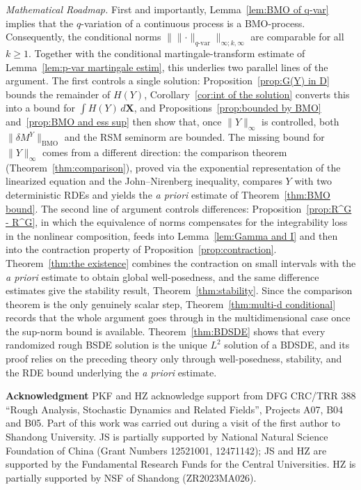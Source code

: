 \documentclass[11pt,reqno]{amsart}
\numberwithin{equation}{section}
\begin{document}
{\em Mathematical Roadmap.} First and importantly,   Lemma~\ref{lem:BMO of q-var} implies that the $q$-variation of a continuous process is a \textrm{BMO}-process. Consequently, the conditional norms $\| \|\bm\cdot\|_{q\text{-}\mathrm{var}} \|_{\infty;k,\infty}$ are comparable for all $k \ge 1$. Together with the conditional martingale-transform estimate of Lemma~\ref{lem:p-var martingale estim}, this underlies two parallel lines of the argument.
The first controls a single solution: Proposition~\ref{prop:G(Y) in D} bounds the remainder of $H(Y)$, Corollary~\ref{cor:int of the solution} converts this into a bound for $\int H(Y)\,d\mathbf X$, and Propositions~\ref{prop:bounded by BMO} and~\ref{prop:BMO and ess sup} then show that, once $\|Y\|_{\infty}$ is controlled, both $\|\delta M^{Y}\|_{\mathrm{BMO}}$ and the RSM seminorm are bounded.
The missing bound for $\|Y\|_{\infty}$ comes from a different direction: the comparison theorem (Theorem~\ref{thm:comparison}), proved via the exponential representation of the linearized equation and the John--Nirenberg inequality, compares $Y$ with two deterministic RDEs and yields the \emph{a priori} estimate of Theorem~\ref{thm:BMO bound}. 
The second line of argument controls differences: Proposition~\ref{prop:R^G - R^G}, in which the equivalence of norms compensates for the integrability loss in the nonlinear composition, feeds into Lemma~\ref{lem:Gamma and I} and then into the contraction property of Proposition~\ref{prop:contraction}. Theorem~\ref{thm:the existence} combines the contraction on small intervals with the \emph{a priori} estimate to obtain global well-posedness, and the same difference estimates give the stability result, Theorem~\ref{thm:stability}.  Since the comparison theorem is the only genuinely scalar step, Theorem~\ref{thm:multi-d conditional} records that the whole argument goes through in the multidimensional case once the sup-norm bound is available.
Theorem~\ref{thm:BDSDE} shows that every randomized rough BSDE solution is the unique $L^2$ solution of a BDSDE, and its proof relies on the preceding theory only through well-posedness, stability, and the RDE bound underlying the \emph{a priori} estimate.



{\bf Acknowledgment}
PKF and HZ acknowledge support from DFG CRC/TRR 388 ``Rough
Analysis, Stochastic Dynamics and Related Fields'', Projects A07, B04 and B05. Part of this work was carried out during a visit of the first author to Shandong University. 
JS is partially supported by National Natural Science Foundation of China (Grant Numbers 12521001, 12471142); JS and HZ are supported by the Fundamental Research Funds for the Central Universities.  HZ is partially supported by NSF of Shandong (ZR2023MA026).
\end{document}
